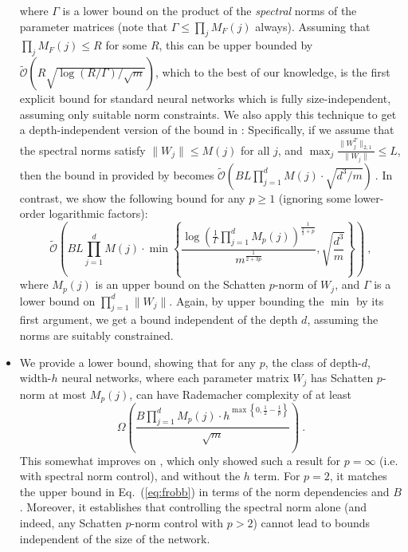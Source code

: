 \documentclass[final,12pt]{colt2018} %
\newcommand{\Ocal}{\mathcal{O}}
\newcommand{\norm}[1]{\|#1\|}
\renewcommand{\eqref}[1]{Eq.~(\ref{#1})}
\begin{document}
\begin{itemize}[leftmargin=*]
	where $\Gamma$ is a lower bound on the product of the \emph{spectral} 
	norms of the parameter matrices (note that $\Gamma\leq \prod_{j}M_F(j)$ 
	always). 
	Assuming that $\prod_{j}M_F(j)\leq 
	R$ for some $R$, this can be upper bounded by 
	$\tilde{\Ocal}(R\sqrt{\log(R/\Gamma)/\sqrt{m}})$, which to the best of 
	our 
	knowledge, is the first explicit bound for standard neural networks 
	which 
	is fully size-independent, assuming only suitable norm constraints. 
	We also apply this technique to get a depth-independent version of the 
	bound in \citep{bartlett2017spectrally}: Specifically, if we assume 
	that the spectral norms satisfy $\norm{W_j}\leq M(j)$ for all $j$, and 
	$\max_j \frac{\norm{W_j^T}_{2,1}}{\norm{W_j}}\leq L$, then the bound in 
	provided by
	\citet{bartlett2017spectrally} becomes
	$
	\tilde{\Ocal}\left(
	BL\prod_{j=1}^{d}M(j)\cdot\sqrt{d^3/m}\right)~.
	$
	In contrast, we show the following bound for any $p\geq 1$ (ignoring 
	some 
	lower-order logarithmic factors):
	\[
	\tilde{\Ocal} \left( BL\prod_{j=1}^d M(j)
	\cdot \min \left\{ \frac{\log \left( \frac{1}{\Gamma} \prod_{j=1}^d 
		M_p(j) 
		\right)^{\frac{1}{\frac{2}{3}+p}} 
	}{m^{\frac{1}{2+3p}}},\sqrt{\frac{d^{3}}{ m}} 
	\right\} \right)~,
	\]
	where $M_p(j)$ is an upper bound on the Schatten $p$-norm of $W_j$, and 
	$\Gamma$ is a lower bound on $\prod_{j=1}^{d} \norm{W_j}$. Again, by 
	upper bounding the $\min$ by 
	its first argument, we get a bound independent of the depth $d$, 
	assuming 
	the norms are suitably constrained.
	\item We provide a lower bound, showing 
	that 
	for any $p$, the class of depth-$d$, width-$h$ neural networks, where 
	each 
	parameter matrix $W_j$ has Schatten $p$-norm at most $M_p(j)$, can have 
	Rademacher complexity of at least
	\[
	\Omega\left(
	\frac{B\prod_{j=1}^{d}M_p(j)\cdot 
		h^{\max\left\{0,\frac{1}{2}-\frac{1}{p}\right\}}}{\sqrt{m}}\right)~.
	\]
	This somewhat improves on \citet[Theorem 
	3.6]{bartlett2017spectrally}, which only showed such a result for 
	$p=\infty$ (i.e. with spectral norm control), and without the $h$ term. 
	For 
	$p=2$, it matches the upper bound in \eqref{eq:frobb} in terms of the 
	norm 
	dependencies and $B$. Moreover, it establishes that controlling the  
	spectral norm alone (and indeed, any Schatten $p$-norm control with 
	$p>2$) 
	cannot lead to bounds independent of the size of the network.
\end{itemize}



%	

\end{document}
